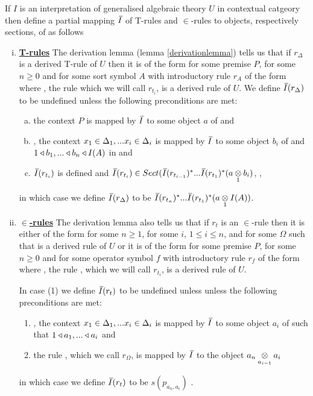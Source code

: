 \newpage
\begin{definition} 
If $I$ is an interpretation of generalised algebraic theory $U$ in contextual catgeory \catcw
then define a
partial mapping $\Ibar$  of T-rules and $\in$-rules to objects, respectively sections, of \catcw
as follows
\begin{enumerate}[(i)] 
\item \underline{\textbf{T-rules}} 
The derivation lemma (lemma \ref{derivationlemma}) tells us that if $r_\Delta$ is a derived T-rule of $U$  then it is of the form  for some premise $P$, for some $n \geq 0$ and for some sort symbol $A$ with introductory rule $r_A$ of the form  where \foreachi, the rule 
 which we will call $r_{t_i}$, is a derived rule of $U$. 
We define $\Ibar(r_\Delta)$ to be undefined unless the following preconditions are met:
\begin{enumerate}[(a)]
\item
the context  $P$ is mapped by $\Ibar$ to some object $a$ of \catcw and 
\item
\foreachi, the context $\xDelta{i}$ is mapped by $\Ibar$ to some object $b_i$ of \catcw
and $1 \base b_1,...\base b_n \base I(A)$ in \catcw and
\item
$\Ibar(r_{t_i})$ is defined and $\Ibar(r_{t_i}) \in Sect(\Ibar(r_{t_{i-1}})^*...\Ibar(r_{t_1})^*(\crossx{a}{b_i}{1})$, \foreachi,
\end{enumerate}
in which case we define $\Ibar(r_\Delta)$ to be $\Ibar(r_{t_n})^*...\Ibar(r_{t_1})^*(\crossx{a}{I(A)}{1})$. 
\item \underline{\textbf{$\boldsymbol {\in}$-rules}} 
The derivation lemma also tells us that if $r_t$ is an $\in$-rule then it is  
either  of the form  for some $n \ge 1$, for some $i$, $1 \leq i \leq n$, 
and for some $\Omega$ such that  is a derived rule of $U$
or  it is of the form  for some premise $P$, for some $n \geq 0$ and for some operator symbol $f$ with introductory rule $r_f$ of the form  where \foreachi, the rule 
, which we will call $r_{t_i}$, is a derived rule of $U$. 

In  case (1) we define $\Ibar(r_t)$ to be undefined unless  unless the following preconditions are met:
\begin{enumerate}
\item
\foreachi, the context $\xDelta{i}$ is mapped by $\Ibar$ to some object $a_i$ of \catcw such
that $1 \base a_1,...\base a_i$ and
\item the rule , which we call $r_\Omega$, is mapped by $\Ibar$ to the object $\crossx{a_n}{a_i}{a_{i-1}}$
\end{enumerate}
in which case we define $\Ibar(r_t)$ to be $s(p_{a_n,a_i})$ . 


\end{enumerate}
\end{definition}
